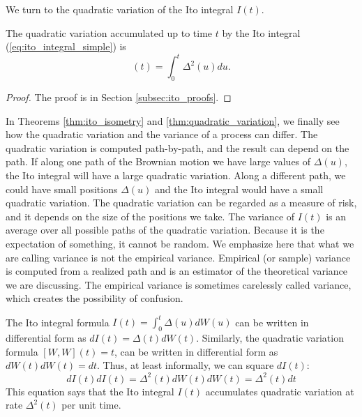 \documentclass[\topdir/lecture\_notes.tex]{subfiles}
\begin{document}
We turn to the quadratic variation of the Ito integral \(I(t)\).
\begin{theorem}\label{thm:quadratic_variation}
The quadratic variation accumulated up to time \(t\) by the Ito integral (\ref{eq:ito_integral_simple}) is
\begin{equation}
[I, I](t)=\int_{0}^{t} \Delta^{2}(u) du. \label{eq:quadratic_variation_formula}
\end{equation}
\end{theorem}
\begin{proof} The proof is in Section \ref{subsec:ito_proofs}.\end{proof}

In Theorems \ref{thm:ito_isometry} and \ref{thm:quadratic_variation}, we finally see how the quadratic variation and the variance of a process can differ. The quadratic variation is computed path-by-path, and the result can depend on the path. If along one path of the Brownian motion we have large values of \(\Delta(u)\), the Ito integral will have a large quadratic variation. Along a different path, we could have small positions \(\Delta(u)\) and the Ito integral would have a small quadratic variation. The quadratic variation can be regarded as a measure of risk, and it depends on the size of the positions we take. The variance of \(I(t)\) is an average over all possible paths of the quadratic variation. Because it is the expectation of something, it cannot be random. We emphasize here that what we are calling variance is not the empirical variance. Empirical (or sample) variance is computed from a realized path and is an estimator of the theoretical variance we are discussing. The empirical variance is sometimes carelessly called variance, which creates the possibility of confusion.

The Ito integral formula \(I(t)=\int_{0}^{t} \Delta(u) dW(u)\) can be written in differential form as \(dI(t)=\Delta(t) dW(t)\). Similarly, the quadratic variation formula \([W,W](t)=t\), can be written in differential form as \(dW(t) dW(t)=dt\). Thus, at least informally, we can square \(dI(t)\):
\begin{equation}
dI(t) dI(t)=\Delta^{2}(t) dW(t) dW(t)=\Delta^{2}(t) dt
\end{equation}
This equation says that the Ito integral \(I(t)\) accumulates quadratic variation at rate \(\Delta^{2}(t)\) per unit time. 
\end{document}
